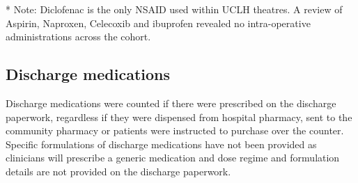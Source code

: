 \documentclass[
  letterpaper,
  DIV=11,
  numbers=noendperiod]{scrreprt}
\newcounter{none} %
\begin{document}
\begin{stbl}
{}

\caption{\label{stbl-intra-op-formulations}\textbf{Formulations for
intraoperative medications.}}

\end{stbl}%

* Note: Diclofenac is the only NSAID used within UCLH theatres. A review
of Aspirin, Naproxen, Celecoxib and ibuprofen revealed no
intra-operative administrations across the cohort.

\subsection{Discharge medications}\label{sec-sm-data-spec-discharge}

Discharge medications were counted if there were prescribed on the
discharge paperwork, regardless if they were dispensed from hospital
pharmacy, sent to the community pharmacy or patients were instructed to
purchase over the counter. Specific formulations of discharge
medications have not been provided as clinicians will prescribe a
generic medication and dose regime and formulation details are not
provided on the discharge paperwork.

\begin{stbl}


\caption{\label{stbl-discharge-formulations}\textbf{Formulations for
discharge medications.}}

\end{stbl}%
\end{document}
